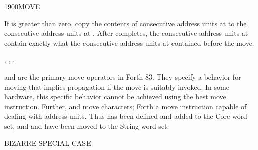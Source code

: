 \begin{worddef}{1900}{MOVE}
\item {}

	If  is greater than zero, copy the contents of 
	consecutive address units at  to the 
	consecutive address units at . After 
	completes, the  consecutive address units at 
	contain exactly what the  consecutive address units at
	 contained before the move.

\see	{},
	,
	.

	\begin{rationale} %
		 and  are the primary
		move operators in Forth 83. They specify a behavior for moving
		that implies propagation if the move is suitably invoked. In
		some hardware, this specific behavior cannot be achieved using
		the best move instruction. Further,  and
		 move characters; Forth  a move
		instruction capable of dealing with address units. Thus
		 has been defined and added to the Core word set,
		and  and  have been
		moved to the String word set.
	\end{rationale}

	\begin{testing} %
		 \hfill {} BIZARRE SPECIAL CASE \\

		 \\

		 \\

		 \\

		 \\

		 \\
	\end{testing}
\end{worddef}


